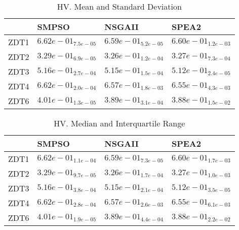 \documentclass{article}
\begin{document}
\begin{table}
\caption{HV. Mean and Standard Deviation}
\label{table: HV}
\centering
\begin{scriptsize}
\begin{tabular}{llll}
\hline & SMPSO & NSGAII &  SPEA2\\
\hline 
ZDT1 & \cellcolor{gray95}$  6.62e-01_{ 7.5e-05}$ & $  6.59e-01_{ 5.2e-05}$ & \cellcolor{gray25}$  6.60e-01_{ 1.2e-03}$ \\
ZDT2 & \cellcolor{gray95}$  3.29e-01_{ 6.9e-05}$ & $  3.26e-01_{ 1.2e-04}$ & \cellcolor{gray25}$  3.27e-01_{ 7.3e-04}$ \\
ZDT3 & \cellcolor{gray95}$  5.16e-01_{ 2.7e-04}$ & \cellcolor{gray25}$  5.15e-01_{ 1.5e-04}$ & $  5.12e-01_{ 2.4e-05}$ \\
ZDT4 & \cellcolor{gray95}$  6.62e-01_{ 2.0e-04}$ & \cellcolor{gray25}$  6.57e-01_{ 1.8e-03}$ & $  6.55e-01_{ 4.3e-03}$ \\
ZDT6 & \cellcolor{gray95}$  4.01e-01_{ 1.3e-05}$ & \cellcolor{gray25}$  3.89e-01_{ 3.1e-04}$ & $  3.88e-01_{ 1.5e-02}$ \\
\hline
\end{tabular}
\end{scriptsize}
\end{table}

\begin{table}
\caption{HV. Median and Interquartile Range}
\label{table: HV}
\centering
\begin{scriptsize}
\begin{tabular}{llll}
\hline & SMPSO & NSGAII &  SPEA2\\
\hline 
ZDT1 & \cellcolor{gray95}$  6.62e-01_{ 1.1e-04}$ & $  6.59e-01_{ 7.3e-05}$ & \cellcolor{gray25}$  6.60e-01_{ 1.7e-03}$ \\
ZDT2 & \cellcolor{gray95}$  3.29e-01_{ 9.7e-05}$ & $  3.26e-01_{ 1.7e-04}$ & \cellcolor{gray25}$  3.27e-01_{ 1.0e-03}$ \\
ZDT3 & \cellcolor{gray95}$  5.16e-01_{ 3.8e-04}$ & \cellcolor{gray25}$  5.15e-01_{ 2.1e-04}$ & $  5.12e-01_{ 3.5e-05}$ \\
ZDT4 & \cellcolor{gray95}$  6.62e-01_{ 2.8e-04}$ & \cellcolor{gray25}$  6.57e-01_{ 2.6e-03}$ & $  6.55e-01_{ 6.1e-03}$ \\
ZDT6 & \cellcolor{gray95}$  4.01e-01_{ 1.9e-05}$ & \cellcolor{gray25}$  3.89e-01_{ 4.4e-04}$ & $  3.88e-01_{ 2.2e-02}$ \\
\hline
\end{tabular}
\end{scriptsize}
\end{table}
\end{document}
